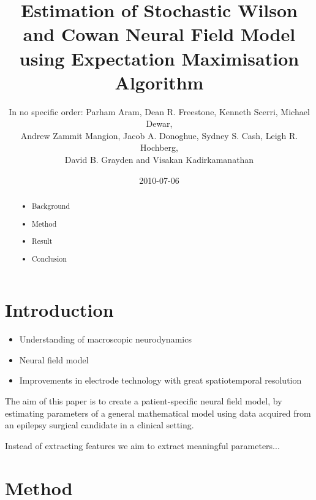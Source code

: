 \documentclass[]{article}
\title{Estimation of Stochastic Wilson and Cowan Neural Field Model using Expectation Maximisation Algorithm}
\author{In no specific order: Parham Aram, Dean R. Freestone, Kenneth Scerri, Michael Dewar,\\
 Andrew Zammit Mangion, Jacob A. Donoghue, Sydney S. Cash, Leigh R. Hochberg,\\
 David B. Grayden and Visakan Kadirkamanathan  }
\date{2010-07-06}
\newif\ifpdf
\begin{document}
\ifpdf
\DeclareGraphicsExtensions{.pdf, .jpg, .tif}
\else
{}
\fi

\maketitle


\begin{abstract}
	
	\begin{itemize}
		\item Background
		\item Method
		\item Result
		\item Conclusion
	\end{itemize}
\end{abstract}

\section{Introduction}
\begin{itemize}
	\item Understanding of macroscopic neurodynamics
	\item Neural field model
	\item Improvements in electrode technology with great spatiotemporal resolution
\end{itemize}
The aim of this paper is to create a patient-specific neural field model, by estimating parameters of a general mathematical model using data acquired from an epilepsy surgical candidate in a clinical setting. 

Instead of extracting features we aim to extract meaningful parameters...

\section{Method}
\end{document}

